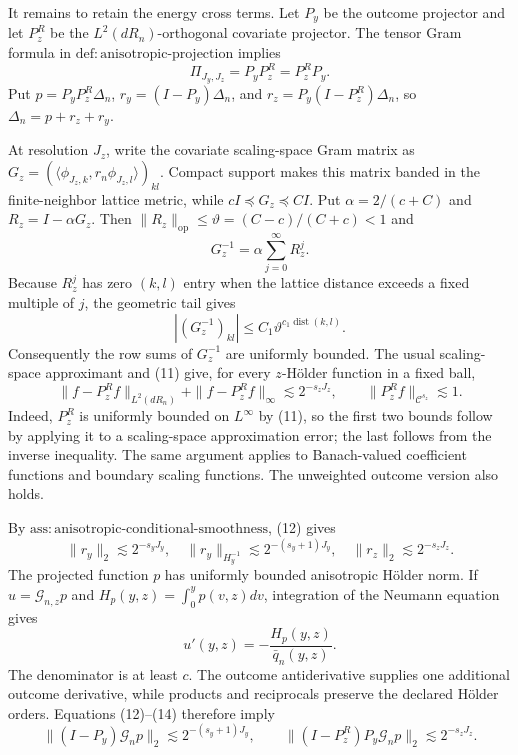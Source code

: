 It remains to retain the energy cross terms. Let \(P_y\) be the outcome projector and let \(P_z^R\) be the \(L^2(dR_n)\)-orthogonal covariate projector. The tensor Gram formula in \(\mathrm{def{:}anisotropic\text{-}projection}\) implies
\[
\Pi_{J_y,J_z}=P_yP_z^R=P_z^RP_y.                                \tag{10}
\]
Put \(p=P_yP_z^R\Delta_n\), \(r_y=(I-P_y)\Delta_n\), and \(r_z=P_y(I-P_z^R)\Delta_n\), so \(\Delta_n=p+r_z+r_y\).

At resolution \(J_z\), write the covariate scaling-space Gram matrix as \(G_z=(\langle\phi_{J_z,k},r_n\phi_{J_z,l}\rangle)_{kl}\). Compact support makes this matrix banded in the finite-neighbor lattice metric, while \(cI\preceq G_z\preceq CI\). Put \(\alpha=2/(c+C)\) and \(R_z=I-\alpha G_z\). Then \(\|R_z\|_{\mathrm{op}}\le\vartheta=(C-c)/(C+c)<1\) and
\[
G_z^{-1}=\alpha\sum_{j=0}^{\infty}R_z^j.
\]
Because \(R_z^j\) has zero \((k,l)\) entry when the lattice distance exceeds a fixed multiple of \(j\), the geometric tail gives
\[
|(G_z^{-1})_{kl}|\le C_1\vartheta^{c_1\operatorname{dist}(k,l)}. \tag{11}
\]
Consequently the row sums of \(G_z^{-1}\) are uniformly bounded. The usual scaling-space approximant and (11) give, for every \(z\)-H\"older function in a fixed ball,
\[
\|f-P_z^Rf\|_{L^2(dR_n)}+\|f-P_z^Rf\|_\infty\lesssim2^{-s_zJ_z},
\qquad \|P_z^Rf\|_{\mathcal C^{s_z}}\lesssim1.                 \tag{12}
\]
Indeed, \(P_z^R\) is uniformly bounded on \(L^\infty\) by (11), so the first two bounds follow by applying it to a scaling-space approximation error; the last follows from the inverse inequality. The same argument applies to Banach-valued coefficient functions and boundary scaling functions. The unweighted outcome version also holds.

By \(\mathrm{ass{:}anisotropic\text{-}conditional\text{-}smoothness}\), (12) gives
\[
\|r_y\|_2\lesssim2^{-s_yJ_y},
\quad \|r_y\|_{H_y^{-1}}\lesssim2^{-(s_y+1)J_y},
\quad \|r_z\|_2\lesssim2^{-s_zJ_z}.                            \tag{13}
\]
The projected function \(p\) has uniformly bounded anisotropic H\"older norm. If \(u=\mathcal G_{n,z}p\) and \(H_p(y,z)=\int_0^yp(v,z)dv\), integration of the Neumann equation gives
\[
u'(y,z)=-\frac{H_p(y,z)}{\bar q_n(y,z)}.                         \tag{14}
\]
The denominator is at least \(c\). The outcome antiderivative supplies one additional outcome derivative, while products and reciprocals preserve the declared H\"older orders. Equations (12)--(14) therefore imply
\[
\|(I-P_y)\mathcal G_np\|_2\lesssim2^{-(s_y+1)J_y},
\qquad
\|(I-P_z^R)P_y\mathcal G_np\|_2\lesssim2^{-s_zJ_z}.            \tag{15}
\]

